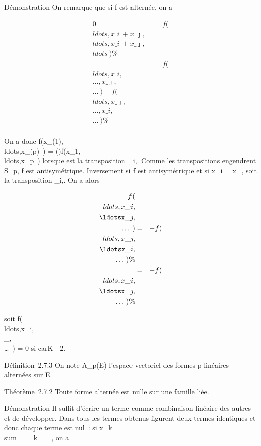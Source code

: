 \documentclass[]{article}
\begin{document}
Démonstration On remarque que si f est alternée, on a

\begin{align*} 0& =&
f(\\ldots,x\_i~
+
x\_\jmath,\\ldots,x\_i~
+
x\_\jmath,\\ldots~)
\%& \\ & =&
f(\\ldots,x\_i,\\\ldots,x\_\jmath,\\\ldots~)
+
f(\\ldots,x\_\jmath,\\\ldots,x\_i,\\\ldots~)\%&
\\ \end{align*}

On a donc
f(x\_\sigma(1),\\ldots,x\_\sigma(p)~)
=
\epsilon(\sigma)f(x\_1,\\ldots,x\_p~)
lorsque \sigma est la transposition \tau\_i,\jmath. Comme les transpositions
engendrent S\_p, f est antisymétrique. Inversement si f est
antisymétrique et si x\_i = x\_\jmath, soit \sigma la
transposition \tau\_i,\jmath. On a alors

\begin{align*}
f(\\ldots,x\_i,\\\ldotsx\_\jmath,\\\ldots~)&
=&
-f(\\ldots,x\_\jmath,\\\ldotsx\_i,\\\ldots~)\%&
\\ & =&
-f(\\ldots,x\_i,\\\ldotsx\_\jmath,\\\ldots~)\%&
\\ \end{align*}

soit
f(\\ldots,x\_i,\\\ldotsx\_\jmath,\\\ldots~)
= 0 si carK\mathrel\neq~~2.

Définition~2.7.3 On note A\_p(E) l'espace vectoriel des formes
p-linéaires alternées sur E.

Théorème~2.7.2 Toute forme alternée est nulle sur une famille liée.

Démonstration Il suffit d'écrire un terme comme combinaison linéaire des
autres et de développer. Dans tous les termes obtenus figurent deux
termes identiques et donc chaque terme est nul~: si x\_k
= \\sum ~
\_\jmath\neq~k\alpha~\_\jmathx\_\jmath, on a
\end{document}

